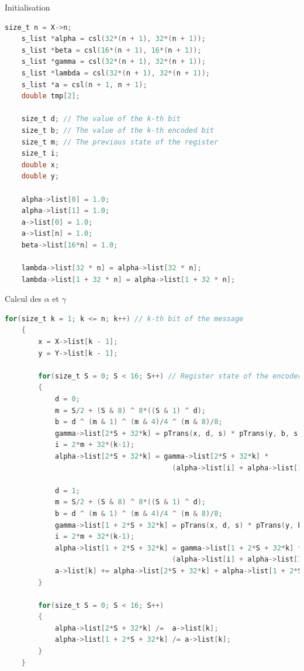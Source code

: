 \documentclass[11pt]{beamer}
\begin{document}
\begin{frame}{Initialisation}
	\begin{lstlisting}[language=C]
    size_t n = X->n;
    s_list *alpha = csl(32*(n + 1), 32*(n + 1));
    s_list *beta = csl(16*(n + 1), 16*(n + 1));
    s_list *gamma = csl(32*(n + 1), 32*(n + 1));
    s_list *lambda = csl(32*(n + 1), 32*(n + 1));
    s_list *a = csl(n + 1, n + 1);
    double tmp[2];

    size_t d; // The value of the k-th bit
    size_t b; // The value of the k-th encoded bit
    size_t m; // The previous state of the register
    size_t i;
    double x;
    double y;

    alpha->list[0] = 1.0;
    alpha->list[1] = 1.0;
    a->list[0] = 1.0;
    a->list[n] = 1.0;
    beta->list[16*n] = 1.0;

    lambda->list[32 * n] = alpha->list[32 * n];
    lambda->list[1 + 32 * n] = alpha->list[1 + 32 * n];
	\end{lstlisting}
\end{frame}

\begin{frame}{Calcul des $\alpha$ et $\gamma$}
	\begin{lstlisting}[language=C]
	for(size_t k = 1; k <= n; k++) // k-th bit of the message
    {
        x = X->list[k - 1];
        y = Y->list[k - 1];

        for(size_t S = 0; S < 16; S++) // Register state of the encoder
        {
            d = 0;
            m = S/2 + (S & 8) ^ 8*((S & 1) ^ d);
            b = d ^ (m & 1) ^ (m & 4)/4 ^ (m & 8)/8;
            gamma->list[2*S + 32*k] = pTrans(x, d, s) * pTrans(y, b, s);
            i = 2*m + 32*(k-1);
            alpha->list[2*S + 32*k] = gamma->list[2*S + 32*k] *
                                        (alpha->list[i] + alpha->list[1 + i]);

            d = 1;
            m = S/2 + (S & 8) ^ 8*((S & 1) ^ d);
            b = d ^ (m & 1) ^ (m & 4)/4 ^ (m & 8)/8;
            gamma->list[1 + 2*S + 32*k] = pTrans(x, d, s) * pTrans(y, b, s);
            i = 2*m + 32*(k-1);
            alpha->list[1 + 2*S + 32*k] = gamma->list[1 + 2*S + 32*k] *
                                        (alpha->list[i] + alpha->list[1 + i]);
            a->list[k] += alpha->list[2*S + 32*k] + alpha->list[1 + 2*S + 32*k];
        }

        for(size_t S = 0; S < 16; S++)
        {
            alpha->list[2*S + 32*k] /=  a->list[k];
            alpha->list[1 + 2*S + 32*k] /= a->list[k];
        }
    }
	\end{lstlisting}
\end{frame}
\end{document}

